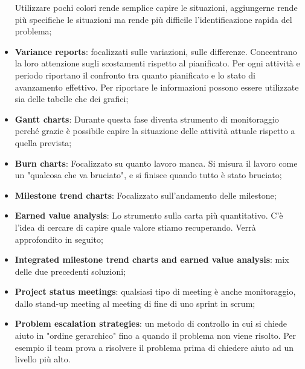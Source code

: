 \begin{itemize}
	Utilizzare pochi colori rende semplice capire le situazioni, aggiungerne rende più specifiche le situazioni ma rende più difficile l'identificazione rapida del problema;
	\item \textbf{Variance reports}: focalizzati sulle variazioni, sulle differenze. Concentrano la loro attenzione sugli scostamenti rispetto al pianificato. Per ogni attività e periodo riportano il confronto tra quanto pianificato e lo stato di avanzamento effettivo. Per riportare le informazioni possono essere utilizzate sia delle tabelle che dei grafici;
	\item \textbf{Gantt charts}: Durante questa fase diventa strumento di monitoraggio perché grazie è possibile capire la situazione delle attività attuale rispetto a quella prevista;
	\item \textbf{Burn charts}: Focalizzato su quanto lavoro manca. Si misura il lavoro come un "qualcosa che va bruciato", e si finisce quando tutto è stato bruciato;
	\item \textbf{Milestone trend charts}: Focalizzato sull'andamento delle milestone;
	\item \textbf{Earned value analysis}: Lo strumento sulla carta più quantitativo. C'è l'idea di cercare di capire quale valore stiamo recuperando. Verrà approfondito in seguito;
	\item \textbf{Integrated milestone trend charts and earned value analysis}: mix delle due precedenti soluzioni;
	\item \textbf{Project status meetings}: qualsiasi tipo di meeting è anche monitoraggio, dallo stand-up meeting al meeting di fine di uno sprint in scrum;
	\item \textbf{Problem escalation strategies}: un metodo di controllo in cui si chiede aiuto in "ordine gerarchico" fino a quando il problema non viene risolto. Per esempio il team prova a risolvere il problema prima di chiedere aiuto ad un livello più alto.
\end{itemize}
